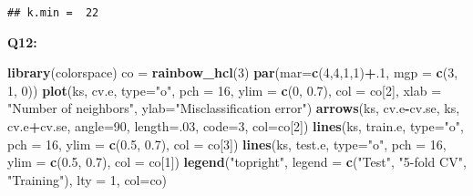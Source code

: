 \documentclass[]{article}
\newenvironment{Shaded}{\begin{snugshade}}{\end{snugshade}}
\newcommand{\KeywordTok}[1]{\textcolor[rgb]{0.13,0.29,0.53}{\textbf{#1}}}
\newcommand{\DataTypeTok}[1]{\textcolor[rgb]{0.13,0.29,0.53}{#1}}
\newcommand{\DecValTok}[1]{\textcolor[rgb]{0.00,0.00,0.81}{#1}}
\newcommand{\FloatTok}[1]{\textcolor[rgb]{0.00,0.00,0.81}{#1}}
\newcommand{\StringTok}[1]{\textcolor[rgb]{0.31,0.60,0.02}{#1}}
\newcommand{\OperatorTok}[1]{\textcolor[rgb]{0.81,0.36,0.00}{\textbf{#1}}}
\newcommand{\NormalTok}[1]{#1}
\begin{document}
\begin{verbatim}
## k.min =  22
\end{verbatim}

\textbf{Q12:}

\begin{Shaded}
\begin{Highlighting}[]
\KeywordTok{library}\NormalTok{(colorspace)}
\NormalTok{co =}\StringTok{ }\KeywordTok{rainbow_hcl}\NormalTok{(}\DecValTok{3}\NormalTok{)}
\KeywordTok{par}\NormalTok{(}\DataTypeTok{mar=}\KeywordTok{c}\NormalTok{(}\DecValTok{4}\NormalTok{,}\DecValTok{4}\NormalTok{,}\DecValTok{1}\NormalTok{,}\DecValTok{1}\NormalTok{)}\OperatorTok{+}\NormalTok{.}\DecValTok{1}\NormalTok{, }\DataTypeTok{mgp =} \KeywordTok{c}\NormalTok{(}\DecValTok{3}\NormalTok{, }\DecValTok{1}\NormalTok{, }\DecValTok{0}\NormalTok{))}
\KeywordTok{plot}\NormalTok{(ks, cv.e, }\DataTypeTok{type=}\StringTok{"o"}\NormalTok{, }\DataTypeTok{pch =} \DecValTok{16}\NormalTok{, }\DataTypeTok{ylim =} \KeywordTok{c}\NormalTok{(}\DecValTok{0}\NormalTok{, }\FloatTok{0.7}\NormalTok{), }\DataTypeTok{col =}\NormalTok{ co[}\DecValTok{2}\NormalTok{],}
     \DataTypeTok{xlab =} \StringTok{"Number of neighbors"}\NormalTok{, }\DataTypeTok{ylab=}\StringTok{"Misclassification error"}\NormalTok{)}
\KeywordTok{arrows}\NormalTok{(ks, cv.e}\OperatorTok{-}\NormalTok{cv.se, ks, cv.e}\OperatorTok{+}\NormalTok{cv.se, }\DataTypeTok{angle=}\DecValTok{90}\NormalTok{, }\DataTypeTok{length=}\NormalTok{.}\DecValTok{03}\NormalTok{, }\DataTypeTok{code=}\DecValTok{3}\NormalTok{, }\DataTypeTok{col=}\NormalTok{co[}\DecValTok{2}\NormalTok{])}
\KeywordTok{lines}\NormalTok{(ks, train.e, }\DataTypeTok{type=}\StringTok{"o"}\NormalTok{, }\DataTypeTok{pch =} \DecValTok{16}\NormalTok{, }\DataTypeTok{ylim =} \KeywordTok{c}\NormalTok{(}\FloatTok{0.5}\NormalTok{, }\FloatTok{0.7}\NormalTok{), }\DataTypeTok{col =}\NormalTok{ co[}\DecValTok{3}\NormalTok{])}
\KeywordTok{lines}\NormalTok{(ks, test.e, }\DataTypeTok{type=}\StringTok{"o"}\NormalTok{, }\DataTypeTok{pch =} \DecValTok{16}\NormalTok{, }\DataTypeTok{ylim =} \KeywordTok{c}\NormalTok{(}\FloatTok{0.5}\NormalTok{, }\FloatTok{0.7}\NormalTok{), }\DataTypeTok{col =}\NormalTok{ co[}\DecValTok{1}\NormalTok{])}
\KeywordTok{legend}\NormalTok{(}\StringTok{"topright"}\NormalTok{, }\DataTypeTok{legend =} \KeywordTok{c}\NormalTok{(}\StringTok{"Test"}\NormalTok{, }\StringTok{"5-fold CV"}\NormalTok{, }\StringTok{"Training"}\NormalTok{), }\DataTypeTok{lty =} \DecValTok{1}\NormalTok{, }\DataTypeTok{col=}\NormalTok{co)}
\end{Highlighting}
\end{Shaded}
\end{document}
